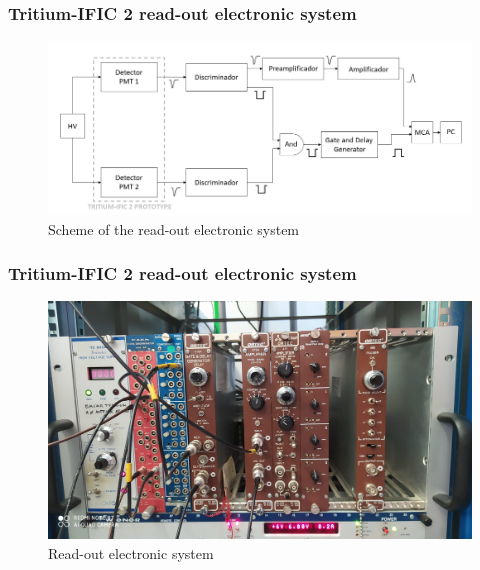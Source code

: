 \documentclass{beamer}
\begin{document}
\begin{frame}
\frametitle{Tritium-IFIC 2 read-out electronic system}

\begin{figure}[hbtp]
\centering
\includegraphics[scale=0.5]{Imagenes/1Tritium_detector/Esquema_electronico.png}
\caption{Scheme of the read-out electronic system}
\end{figure}

\end{frame}

\begin{frame}
\frametitle{Tritium-IFIC 2 read-out electronic system}

\begin{figure}[hbtp]
\centering
\includegraphics[scale=0.16]{Imagenes/1Tritium_detector/Sistema_electronico.jpeg}
\caption{Read-out electronic system}
\end{figure}

\end{frame}
\end{document}
